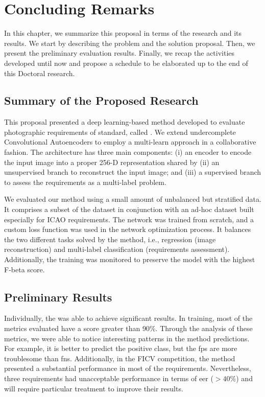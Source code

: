 \section{Concluding Remarks}

In this chapter, we summarize this proposal in terms of the research and its results. We start by describing the problem and the solution proposal. Then, we present the preliminary evaluation results. Finally, we recap the activities developed until now and propose a schedule to be elaborated up to the end of this Doctoral research.

\subsection{Summary of the Proposed Research}

This proposal presented a deep learning-based method developed to evaluate photographic requirements of \icao standard, called \methodname. We extend undercomplete Convolutional Autoencoders to employ a multi-learn approach in a collaborative fashion. The architecture has three main components: (i) an encoder to encode the input image into a proper 256-D representation shared by (ii) an unsupervised branch to reconstruct the input image; and (iii) a supervised branch to assess the requirements as a multi-label problem. 

We evaluated our method using a small amount of unbalanced but stratified data. It comprises a subset of the \ficvtest dataset in conjunction with an ad-hoc dataset built especially for ICAO requirements. The network was trained from scratch, and a custom loss function was used in the network optimization process. It balances the two different tasks solved by the method, i.e., regression (image reconstruction) and multi-label classification (requirements assessment). Additionally, the training was monitored to preserve the model with the highest F-beta score.

\subsection{Preliminary Results}

Individually, the \methodname was able to achieve significant results. In training, most of the metrics evaluated have a score greater than 90\%. Through the analysis of these metrics, we were able to notice interesting patterns in the method predictions. For example, it is better to predict the positive class, but the \aclp{fp} are more troublesome than \aclp{fn}. Additionally, in the FICV competition, the method presented a substantial performance in most of the requirements. Nevertheless, three requirements had unacceptable performance in terms of \acs{eer} ($> 40\%$) and will require particular treatment to improve their results.

